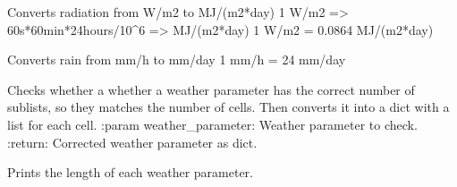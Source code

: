 \documentclass[letterpaper,10pt,english]{sphinxmanual}
\begin{document}
\begin{fulllineitems}

\begin{fulllineitems}
\label{\detokenize{cmf:livestock.components.comp_cmf.CMFWeather.convert_radiation_unit}}
Converts radiation from W/m2 to MJ/(m2*day)
1 W/m2 =\textgreater{} 60s*60min*24hours/10\textasciicircum{}6 =\textgreater{} MJ/(m2*day)
1 W/m2 = 0.0864 MJ/(m2*day)

\end{fulllineitems}


\begin{fulllineitems}
\label{\detokenize{cmf:livestock.components.comp_cmf.CMFWeather.convert_rain_unit}}
Converts rain from mm/h to mm/day
1 mm/h = 24 mm/day

\end{fulllineitems}


\begin{fulllineitems}
\label{\detokenize{cmf:livestock.components.comp_cmf.CMFWeather.match_cell_count}}
Checks whether a whether a weather parameter has the correct number of sublists,
so they matches the number of cells. Then converts it into a dict with a list for each cell.
:param weather\_parameter: Weather parameter to check.
:return: Corrected weather parameter as dict.

\end{fulllineitems}


\begin{fulllineitems}
\label{\detokenize{cmf:livestock.components.comp_cmf.CMFWeather.print_weather_lengths}}
Prints the length of each weather parameter.

\end{fulllineitems}



\end{fulllineitems}
\end{document}
